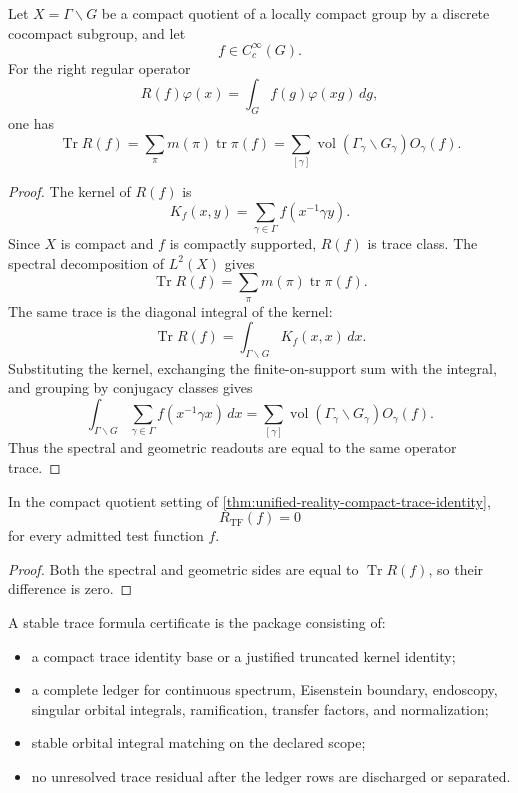 \begin{theorem}
\label{thm:unified-reality-compact-trace-identity}
Let $X=\Gamma\backslash G$ be a compact quotient of a locally compact
group by a discrete cocompact subgroup, and let
$$
f\in C_c^\infty(G).
$$
For the right regular operator
$$
R(f)\varphi(x)=\int_G f(g)\varphi(xg)\,dg,
$$
one has
$$
\operatorname{Tr}R(f)
=
\sum_{\pi}m(\pi)\operatorname{tr}\pi(f)
=
\sum_{[\gamma]}
\operatorname{vol}(\Gamma_\gamma\backslash G_\gamma)O_\gamma(f).
$$
\end{theorem}
\begin{proof}
The kernel of $R(f)$ is
$$
K_f(x,y)=\sum_{\gamma\in\Gamma}f(x^{-1}\gamma y).
$$
Since $X$ is compact and $f$ is compactly supported, $R(f)$ is trace
class. The spectral decomposition of $L^2(X)$ gives
$$
\operatorname{Tr}R(f)
=
\sum_{\pi}m(\pi)\operatorname{tr}\pi(f).
$$
The same trace is the diagonal integral of the kernel:
$$
\operatorname{Tr}R(f)
=
\int_{\Gamma\backslash G}K_f(x,x)\,dx.
$$
Substituting the kernel, exchanging the finite-on-support sum with the
integral, and grouping by conjugacy classes gives
$$
\int_{\Gamma\backslash G}
\sum_{\gamma\in\Gamma}f(x^{-1}\gamma x)\,dx
=
\sum_{[\gamma]}
\operatorname{vol}(\Gamma_\gamma\backslash G_\gamma)O_\gamma(f).
$$
Thus the spectral and geometric readouts are equal to the same operator
trace.
\end{proof}

\begin{corollary}
\label{cor:unified-reality-compact-trace-object-closure}
In the compact quotient setting of
\autoref{thm:unified-reality-compact-trace-identity},
$$
R_{\mathrm{TF}}(f)=0
$$
for every admitted test function $f$.
\end{corollary}
\begin{proof}
Both the spectral and geometric sides are equal to
$\operatorname{Tr}R(f)$, so their difference is zero.
\end{proof}

\begin{definition}
\label{def:unified-reality-stable-trace-formula-cert-closure}
A stable trace formula certificate is the package consisting of:
\begin{itemize}
\item a compact trace identity base or a justified truncated kernel
identity;
\item a complete ledger for continuous spectrum, Eisenstein boundary,
endoscopy, singular orbital integrals, ramification, transfer factors,
and normalization;
\item stable orbital integral matching on the declared scope;
\item no unresolved trace residual after the ledger rows are discharged
or separated.
\end{itemize}
\end{definition}

